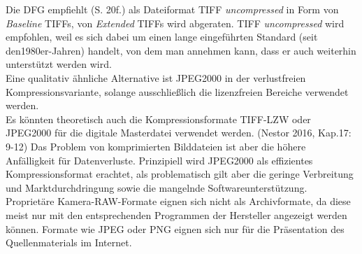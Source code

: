 \documentclass{article}
\begin{document}
        Die DFG empfiehlt (S. 20f.) als Dateiformat TIFF \emph{uncompressed} in Form von \emph{Baseline} TIFFs, von \emph{Extended} TIFFs wird abgeraten. TIFF \emph{uncompressed} wird empfohlen, weil es sich dabei um einen lange eingeführten Standard (seit den1980er-Jahren) handelt, von dem man annehmen kann, dass er auch weiterhin unterstützt werden wird. \\
            
        Eine qualitativ ähnliche Alternative ist JPEG2000 in der verlustfreien Kompressionsvariante, solange ausschließlich die lizenzfreien Bereiche verwendet werden.\\
            
        Es könnten theoretisch auch die Kompressionsformate TIFF-LZW oder JPEG2000 für die digitale Masterdatei verwendet werden. (Nestor 2016, Kap.17: 9-12) Das Problem von komprimierten Bilddateien ist aber die höhere Anfälligkeit für Datenverluste. Prinzipiell wird JPEG2000 als effizientes Kompressionsformat erachtet, als problematisch gilt aber die geringe Verbreitung und Marktdurchdringung sowie die mangelnde Softwareunterstützung.\\
            
        Proprietäre Kamera-RAW-Formate eignen sich nicht als Archivformate, da diese meist nur mit den entsprechenden Programmen der Hersteller angezeigt werden können. Formate wie JPEG oder PNG eignen sich nur für die Präsentation des Quellenmaterials im Internet. \\
            
\end{document}
